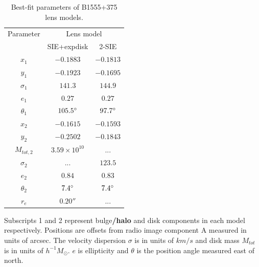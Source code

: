 \documentclass[useAMS,usenatbib]{mn2e}
\begin{document}
\begin{table}
  \caption{Best-fit parameters of B1555+375 lens models.}
  \begin{tabular}{@{}ccc}
\hline 
 Parameter  & \multicolumn{2}{c}{Lens model} \\
		&SIE+expdisk& 2-SIE		   
\\
\hline
$x_1$  	  & $-0.1883$	& $-0.1813$  \\
$y_1$	  &$-0.1923$	&$-0.1695$  \\

$\sigma_1$ &$141.3$     & $144.9$ \\
$e_1$	  & $0.27$	& $0.27$ \\
$\theta_1$ &$105.5 \hbox{$^\circ$}$ & $97.7 \hbox{$^\circ$}$ \\
\hline
$x_2$	  &$-0.1615$ 	&$-0.1593$  \\
$y_2$	  &$-0.2502$	& $-0.1843$  \\
$M_{tot,2}$  & $3.59\times 10^{10} $  & ...	 \\  
$\sigma_2$ & ...        &$123.5$ \\  
$e_2$	  &$0.84$	&$0.83$  \\
$\theta_2$ &$7.4\hbox{$^\circ$}$ &$7.4\hbox{$^\circ$}$  \\
$r_e$	  & $0.20 ''$ &  ... \\
\hline
\end{tabular}

\medskip
Subscripts 1 and 2 represent bulge\textbf{/halo} and disk components in each model respectively. Positions are offsets from radio image component A measured in units of arcsec. The velocity dispersion $\sigma$ is in units of $km/s$ and disk mass $M_{tot}$ is in units of $h^{-1} M_{\odot}$. $e$ is ellipticity and $\theta$ is the position angle measured east of north.

\end{table}
\end{document}
